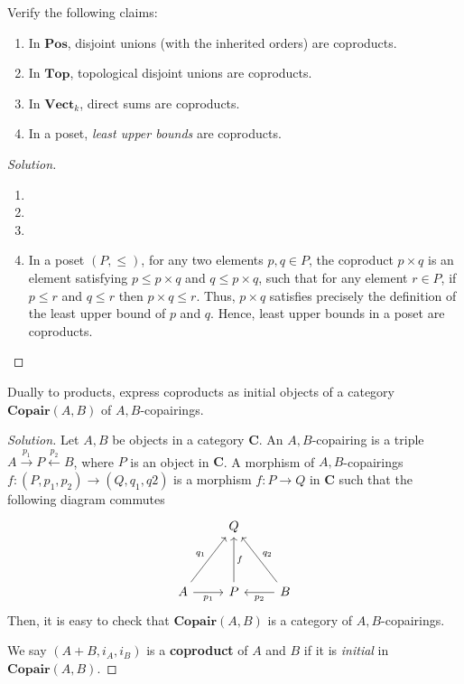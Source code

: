 \documentclass[]{amsbook}
\newcommand{\catname}[1]{\mathbf{#1}}
\newcommand{\0}{\mathbf{0}}
\newcommand{\1}{\mathbf{1}}
\newenvironment{solution}
    {\begin{proof}[Solution]}{\end{proof}}
\begin{document}
\begin{Exercise}
    Verify the following claims:
    \begin{enumerate}
        \item In $\catname{Pos}$, disjoint unions (with the inherited orders)
        are coproducts.
        \item In $\catname{Top}$, topological disjoint unions are coproducts.
        \item In $\catname{Vect}_k$, direct sums are coproducts.
        \item In a poset, \emph{least upper bounds} are coproducts.
    \end{enumerate}
\end{Exercise}
\begin{solution}
\leavevmode
    \begin{enumerate}
        \item %
        \item %
        \item %
        \item In a poset $(P, \le)$, for any two elements $p, q \in P$, the
        coproduct $p \times q$ is an element satisfying $p \le p \times q$ and
        $q \le p \times q$, such that for any element $r \in P$, if $p \le r$
        and $q \le r$ then $p \times q \le r$. Thus, $p \times q$ satisfies
        precisely the definition of the least upper bound of $p$ and $q$. Hence,
        least upper bounds in a poset are coproducts.
    \end{enumerate}
\end{solution}

\begin{Exercise}
    Dually to products, express coproducts as initial objects of a category
    $\catname{Copair}(A, B)$ of $A, B$-copairings.
\end{Exercise}
\begin{solution}
Let $A, B$ be objects in a category $\catname{C}$. An $A, B$-copairing is a
triple $A \xrightarrow{p_1} P \xleftarrow{p_2} B$, where $P$ is an object in
$\catname{C}$. A morphism of $A, B$-copairings $f: (P, p_1, p_2) \to
(Q, q_1, q2)$ is a morphism $f: P \to Q$ in $\catname{C}$ such that the
following diagram commutes
\[
\begin{tikzcd}
    & Q & \\
    & & \\
    A \arrow[uur, "q_1"]
      \arrow[r, swap, "p_1"] &
    P \arrow[uu, swap, "f"] &
    B \arrow[uul, swap, "q_2"]
      \arrow[l, "p_2"]
\end{tikzcd}
\]
Then, it is easy to check that $\catname{Copair}(A, B)$ is a category of
$A, B$-copairings.

We say $(A + B, i_A, i_B)$ is a \textbf{coproduct} of $A$ and $B$ if it is
\emph{initial} in $\catname{Copair}(A, B)$.
\end{solution}
\end{document}
